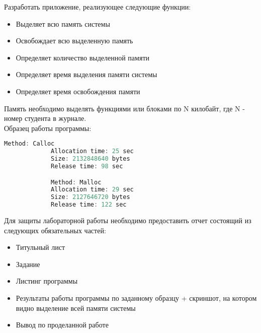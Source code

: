 \documentclass[a4paper,12pt]{article}
\begin{document}

    \begin{flushleft}
        Разработать приложение, реализующее следующие функции:
        \begin{itemize}
            \item Выделяет всю память системы
            \item Освобождает всю выделенную память
            \item Определяет количество выделенной памяти
            \item Определяет время выделения памяти системы
            \item Определяет время освобождения памяти
        \end{itemize}
    \end{flushleft}
  
    Память необходимо выделять функциями  или  блоками по N килобайт, где N - номер студента в журнале. \\

    Образец работы программы:
    \begin{flushleft}
        \begin{lstlisting}[language=c, 
                           breaklines=true, 
                           showtabs=false, 
                           showspaces=false, 
                           showstringspaces=false,
                           basicstyle=\ttfamily \footnotesize]
             Method: Calloc 
             Allocation time: 25 sec 
             Size: 2132848640 bytes 
             Release time: 98 sec

             Method: Malloc 
             Allocation time: 29 sec 
             Size: 2127646720 bytes 
             Release time: 122 sec
        \end{lstlisting}
    \end{flushleft}

    Для защиты лабораторной работы необходимо предоставить отчет состоящий из следующих обязательных частей:
    \begin{itemize}
        \item Титульный лист
        \item Задание
        \item Листинг программы
        \item Результаты работы программы по заданному образцу + скриншот, на котором видно выделение всей памяти системы
        \item Вывод по проделанной работе
    \end{itemize}
  
\end{document}
